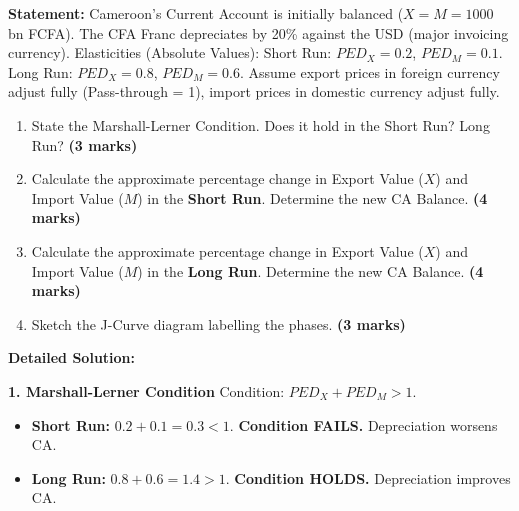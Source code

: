 \documentclass[11pt]{article}
\begin{document}
\begin{exoresolu}
\textbf{Statement:} Cameroon's Current Account is initially balanced ($X = M = 1000$ bn FCFA). The CFA Franc depreciates by 20\% against the USD (major invoicing currency).
Elasticities (Absolute Values):
Short Run: $PED_X = 0.2$, $PED_M = 0.1$.
Long Run: $PED_X = 0.8$, $PED_M = 0.6$.
Assume export prices in foreign currency adjust fully (Pass-through = 1), import prices in domestic currency adjust fully.
\begin{enumerate}
    \item State the Marshall-Lerner Condition. Does it hold in the Short Run? Long Run? \textbf{(3 marks)}
    \item Calculate the approximate percentage change in Export Value ($X$) and Import Value ($M$) in the \textbf{Short Run}. Determine the new CA Balance. \textbf{(4 marks)}
    \item Calculate the approximate percentage change in Export Value ($X$) and Import Value ($M$) in the \textbf{Long Run}. Determine the new CA Balance. \textbf{(4 marks)}
    \item Sketch the J-Curve diagram labelling the phases. \textbf{(3 marks)}
\end{enumerate}

\tcblower
\textbf{Detailed Solution:}

\textbf{1. Marshall-Lerner Condition}
Condition: $PED_X + PED_M > 1$.
\begin{itemize}
    \item \textbf{Short Run:} $0.2 + 0.1 = 0.3 < 1$. \textbf{Condition FAILS.} Depreciation worsens CA.
    \item \textbf{Long Run:} $0.8 + 0.6 = 1.4 > 1$. \textbf{Condition HOLDS.} Depreciation improves CA.
\end{itemize}


\end{exoresolu}
\end{document}
